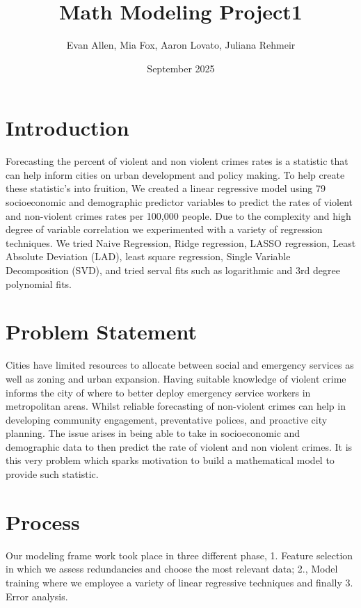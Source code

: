\documentclass{article}
\title{Math Modeling Project1}
\author{Evan Allen, Mia Fox, Aaron Lovato, Juliana Rehmeir}
\date{September 2025}
\begin{document}
\maketitle

\section{Introduction}
Forecasting the percent of violent and non violent crimes rates is a statistic that can help inform cities on urban development and policy making. To help create these statistic's into fruition, We created a linear regressive model using 79 socioeconomic and demographic predictor variables to predict the rates of violent and non-violent crimes rates per 100,000 people. Due to the complexity and high degree of variable correlation we experimented with a variety of regression techniques. We tried Naive Regression, Ridge regression, LASSO regression, Least Absolute Deviation (LAD), least square regression, Single Variable Decomposition (SVD), and tried serval fits such as logarithmic and 3rd degree polynomial fits. 

\section{Problem Statement}
Cities have limited resources to allocate between social and emergency services as well as zoning and urban expansion. Having suitable knowledge of violent crime informs the city of where to better deploy emergency service workers in metropolitan areas. Whilst reliable forecasting of non-violent crimes can help in developing community engagement, preventative polices, and proactive city planning. The issue arises in being able to take in socioeconomic and demographic data to then predict the rate of violent and non violent crimes. It is this very problem which sparks motivation to build a mathematical model to provide such statistic. 

\section{Process}
Our modeling frame work took place in three different phase, 1. Feature selection in which we assess redundancies and choose the most relevant data; 2., Model training where we employee a variety of linear regressive techniques and finally 3. Error analysis. 
\end{document}
